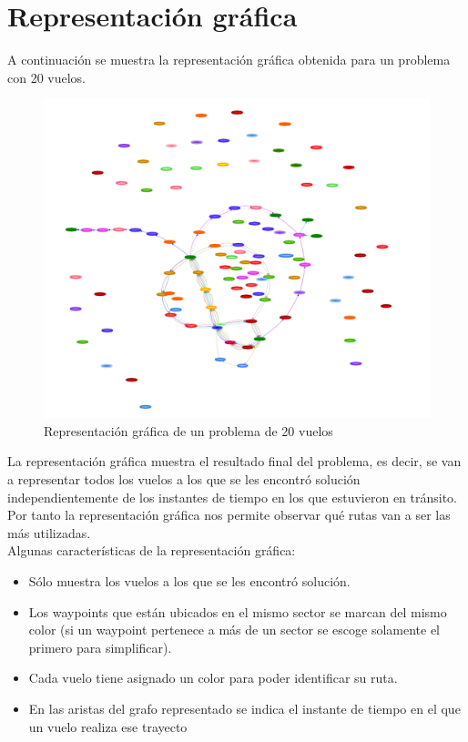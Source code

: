 \section{Representación gráfica}
A continuación se muestra la representación gráfica obtenida para un problema con 20 vuelos.
\begin{figure}[H]
	\begin{center}
		\centering
		\includegraphics[width=1\textwidth]{./imagenes/resultados/resumenRepresentaion.png}
		\caption{Representación gráfica de un problema de 20 vuelos}
		\label{fig: Representación gráfica de un problema de 20 vuelos}
	\end{center}
\end{figure}

La representación gráfica muestra el resultado final del problema, es decir, se van a representar todos los vuelos a los que se les encontró solución independientemente de los instantes de tiempo en los que estuvieron en tránsito. Por tanto la representación gráfica nos permite observar qué rutas van a ser las más utilizadas.\\
Algunas características de la representación gráfica:
\begin{itemize}
	\item Sólo muestra los vuelos a los que se les encontró solución.
	\item Los waypoints que están ubicados en el mismo sector se marcan del mismo color (si un waypoint pertenece a más de un sector se escoge solamente el primero para simplificar).
	\item Cada vuelo tiene asignado un color para poder identificar su ruta.
	\item En las aristas del grafo representado se indica el instante de tiempo en el que un vuelo realiza ese trayecto
\end{itemize}

